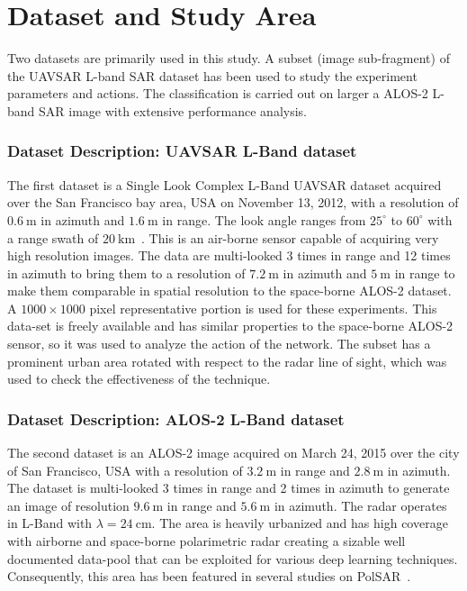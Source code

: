 

\section{Dataset and Study Area}
\label{sec:stage4}

 Two datasets are primarily used in this study.  A subset (image sub-fragment) of the UAVSAR L-band SAR dataset has been used to study the experiment parameters and actions. The classification is carried out on larger a ALOS-2 L-band SAR image with extensive performance analysis.
 
 
\subsubsection{Dataset Description: UAVSAR L-Band dataset}

The first dataset is a Single Look Complex L-Band UAVSAR dataset acquired over the San Francisco bay area, USA on November 13, 2012, with a resolution of $\SI{0.6}{\m}$ in azimuth and $\SI{1.6}{\m}$ in range. The look angle ranges from $25^\circ$ to $60^\circ$ with a range swath of $\SI{20}{\km}$~\cite{fore2015uavsar}.   This is an air-borne sensor capable of acquiring very high resolution images. The data are multi-looked 3 times in range and 12 times in azimuth to bring them to a resolution of $\SI{7.2}{\m}$ in azimuth and $\SI{5}{\m}$ in range to make them comparable in spatial resolution to the space-borne ALOS-2 dataset. A $1000\times1000$ pixel representative portion is used for these experiments. This data-set is freely available and has similar properties to the space-borne ALOS-2 sensor, so it was used to analyze the action of the network. The subset has a prominent urban area rotated with respect to the radar line of sight, which was used to check the effectiveness of the technique. 

\subsubsection{Dataset Description: ALOS-2 L-Band dataset}
The second dataset is an ALOS-2 image acquired on March 24, 2015 over the city of San Francisco, USA with a resolution of $\SI{3.2}{\m}$ in range and $\SI{2.8}{\m}$ in azimuth. The dataset is multi-looked 3 times in range and 2 times in azimuth to generate an image of resolution $\SI{9.6}{\m}$ in range and $\SI{5.6}{\m}$ in azimuth. The radar operates in L-Band with $\lambda=\SI{24}{\cm}$. The area is heavily urbanized and has high coverage with airborne and space-borne polarimetric radar creating a sizable well documented data-pool that can be exploited for various deep learning techniques. Consequently, this area has been featured in several studies on PolSAR~\cite{lee2004classification, bhattacharya2015adaptive}.

